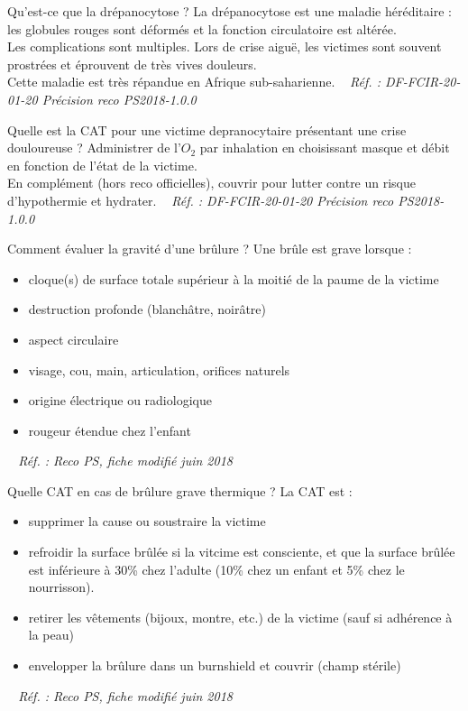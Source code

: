 \documentclass[grid,avery5371,landscape]{flashcards}
\makeatletter
\newcounter{nocarte}
\newcommand{\categ}[1]{%
  \def\@categ{#1}%
  \setcounter{nocarte}{0}%
}
\newcommand{\source}[1]{%
  \medskip
  \itshape%
   ~ \hfill Réf. : #1}
\makeatother
\begin{document}
\color[HTML]{003273}
\categ{PSE}
\begin{flashcard}[bilan]{
 Qu'est-ce que la drépanocytose ?   }
  La drépanocytose est une maladie héréditaire : les globules rouges sont déformés et la fonction circulatoire est altérée. \\
  Les complications sont multiples. Lors de crise aiguë, les victimes sont souvent prostrées et éprouvent de très vives douleurs.\\
  Cette maladie est très répandue en Afrique sub-saharienne.
  \source{DF-FCIR-20-01-20 Précision reco PS2018-1.0.0}
\end{flashcard}


\color[HTML]{003273}
\categ{PSE}
\begin{flashcard}[CAT]{
 Quelle est la CAT pour une victime depranocytaire présentant une crise douloureuse ?   }
  Administrer de l'$O_2$ par inhalation en choisissant masque et débit en fonction de l'état de la victime. \\
    En complément (hors reco officielles), couvrir pour lutter contre un risque d'hypothermie et hydrater.
  \source{DF-FCIR-20-01-20 Précision reco PS2018-1.0.0}
\end{flashcard}


\color[HTML]{003273}
\categ{PSE}
\begin{flashcard}[bilan]{
 Comment évaluer la gravité d'une brûlure ?   }
  Une brûle est grave lorsque :
   \begin{itemize}
       \item cloque(s) de surface totale supérieur à la moitié de la paume de la victime
       \item destruction profonde (blanchâtre, noirâtre)
       \item aspect circulaire
       \item visage, cou, main, articulation, orifices naturels
       \item origine électrique ou radiologique
       \item rougeur étendue chez l'enfant
   \end{itemize}
  \source{Reco PS, fiche modifié juin 2018}
\end{flashcard}


\color[HTML]{003273}
\categ{PSE}
\begin{flashcard}[CAT]{
 Quelle CAT en cas de brûlure grave thermique ?   }
  La CAT est : 
   \begin{itemize}
       \item supprimer la cause ou soustraire la victime
       \item refroidir la surface brûlée si la vitcime est consciente, et que la surface brûlée est inférieure à 30\% chez l'adulte (10\% chez un enfant et 5\% chez le nourrisson).
       \item retirer les vêtements (bijoux, montre, etc.) de la victime (sauf si adhérence à la peau)
       \item envelopper la brûlure dans un burnshield et couvrir (champ stérile)
   \end{itemize}
  \source{Reco PS, fiche modifié juin 2018}
\end{flashcard}
\end{document}
